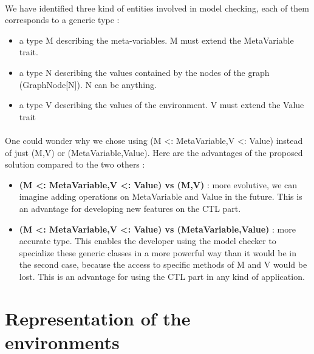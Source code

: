 \documentclass{report}
\begin{document}
\paragraph{}
\hspace{4mm}We have identified three kind of entities involved in model checking, each of them corresponds to a generic type :

\vspace{1.5mm}
\begin{itemize}
\item a type M describing the meta-variables. M must extend the MetaVariable trait.\vspace{1mm}
\item a type N describing the values contained by the nodes of the graph (GraphNode[N]). N can be anything.\vspace{1mm}
\item a type V describing the values of the environment. V must extend the Value trait\vspace{1mm}
\end{itemize}

\paragraph{}
\hspace{4mm}One could wonder why we chose using (M <: MetaVariable,V <: Value) instead of 
just (M,V) or (MetaVariable,Value). Here are the advantages of the proposed solution compared to the two others :

\vspace{1.5mm}
\begin{itemize}
\item \textbf{(M <: MetaVariable,V <: Value) vs (M,V)} : more evolutive, we can imagine adding
operations on MetaVariable and Value in the future. This is an advantage for developing new features on the CTL part.\vspace{1mm}
\item \textbf{(M <: MetaVariable,V <: Value) vs (MetaVariable,Value)} : more accurate type. This enables the developer using the model checker to
specialize these generic classes in a more powerful way than it would be in the second case, because the access to specific methods of M and V would be lost.
This is an advantage for using the CTL part in any kind of application.\vspace{1mm}
\end{itemize}

\section{Representation of the environments}
\end{document}
